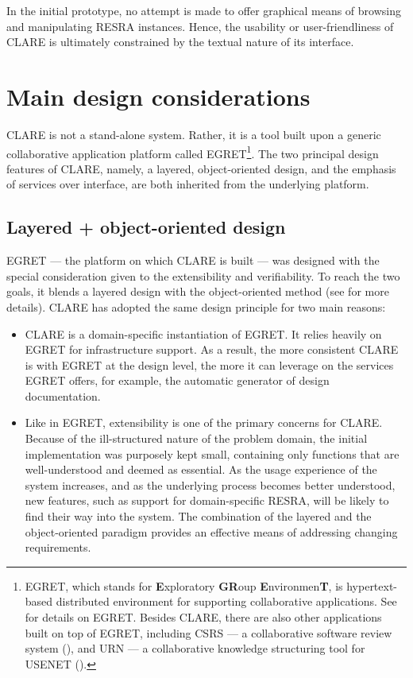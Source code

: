 In the initial prototype, no attempt is made to offer graphical means of
browsing and manipulating RESRA instances. Hence, the usability or
user-friendliness of CLARE is ultimately constrained by the textual nature
of its interface.


\section{Main design considerations}
\label{sec:c4-design}

CLARE is not a stand-alone system. Rather, it is a tool built upon a
generic collaborative application platform called EGRET\footnote{EGRET,
which stands for {\bf E}xploratory {\bf GR}oup {\bf E}nvironmen{\bf T}, is
hypertext-based distributed environment for supporting collaborative
applications. See \cite{csdl-93-09} for details on EGRET. Besides CLARE,
there are also other applications built on top of EGRET, including CSRS ---
a collaborative software review system (\cite{csdl-93-04}), and URN --- a
collaborative knowledge structuring tool for USENET
(\cite{csdl-93-06}).}. The two principal design features of CLARE, namely,
a layered, object-oriented design, and the emphasis of services over
interface, are both inherited from the underlying platform.


\subsection{Layered + object-oriented design}
\label{sec:oo design}

EGRET --- the platform on which CLARE is built --- was designed with the
special consideration given to the extensibility and verifiability. To
reach the two goals, it blends a layered design with the object-oriented
method (see \cite{csdl-93-02} for more details). CLARE has adopted the same
design principle for two main reasons:

\begin{itemize}
\item CLARE is a domain-specific instantiation of EGRET.  It relies
  heavily on EGRET for infrastructure support. As a result, the more
  consistent CLARE is with EGRET at the design level, the more it can
  leverage on the services EGRET offers, for example, the automatic
  generator of design documentation.
  
\item Like in EGRET, extensibility is one of the primary concerns for
  CLARE.  Because of the ill-structured nature of the problem domain, the
  initial implementation was purposely kept small, containing only
  functions that are well-understood and deemed as essential. As the usage
  experience of the system increases, and as the underlying process becomes
  better understood, new features, such as support for domain-specific
  RESRA, will be likely to find their way into the system.  The combination
  of the layered and the object-oriented paradigm provides an effective
  means of addressing changing requirements.
\end{itemize}

